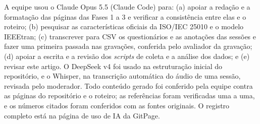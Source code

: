 A equipe usou o Claude Opus 5.5 (Claude Code) para: (a) apoiar a redação e a formatação das páginas das Fases 1 a 3 e verificar a consistência entre elas e o roteiro; (b) pesquisar as características oficiais da ISO/IEC 25010 e o modelo IEEEtran; (c) transcrever para CSV os questionários e as anotações das sessões e fazer uma primeira passada nas gravações, conferida pelo avaliador da gravação; (d) apoiar a escrita e a revisão dos \textit{scripts} de coleta e a análise dos dados; e (e) revisar este artigo. O DeepSeek v4 foi usado na estruturação inicial do repositório, e o Whisper, na transcrição automática do áudio de uma sessão, revisada pelo moderador. Todo conteúdo gerado foi conferido pela equipe contra as páginas do repositório e o roteiro; as referências foram verificadas uma a uma, e os números citados foram conferidos com as fontes originais. O registro completo está na página de uso de IA da GitPage.
